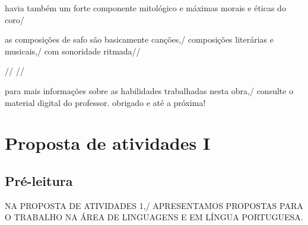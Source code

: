 \documentclass[12pt]{extarticle}
\begin{document}
havia também um forte componente mitológico e máximas morais e éticas do coro/

as composições de safo são basicamente canções,/ composições literárias e musicais,/ com sonoridade ritmada//

 //
//
 
para mais informações sobre as habilidades trabalhadas nesta obra,/ consulte o material digital do professor. obrigado e até a próxima!


\section{Proposta de atividades I}


\subsection{Pré-leitura}







NA PROPOSTA DE ATIVIDADES 1,/ APRESENTAMOS PROPOSTAS PARA O TRABALHO NA ÁREA DE LINGUAGENS E EM LÍNGUA PORTUGUESA.
 
\end{document}
